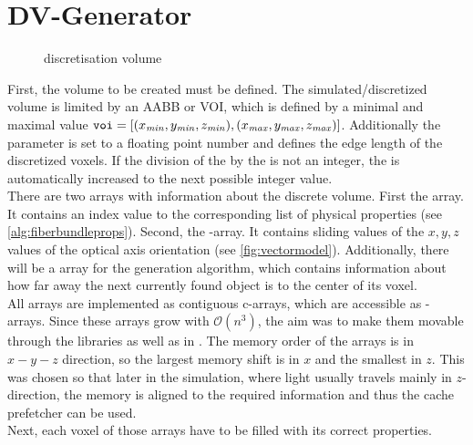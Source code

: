 \section{DV-Generator}
\label{sec:dv_generator}
% 
\begin{figure}[!t]
\centering
\setlength{\tikzwidth}{0.5\textwidth}
\caption{discretisation volume}
\label{fig:discVol}
\end{figure}
% 
First, the volume to be created must be defined.
The simulated/discretized volume is limited by an \ac{AABB} or \ac{VOI}, which is defined by a minimal and maximal value $\texttt{voi} = [(x_{\mathit{min}}, y_{\mathit{min}}, z_{\mathit{min}}),(x_{\mathit{max}}, y_{\mathit{max}}, z_{\mathit{max}})]$.
Additionally the \voxelsize{} parameter \voxels{} is set to a floating point number and defines the edge length of the discretized voxels.
If the division of the \voi{} by the \voxelsize{} is not an integer, the \voi{} is automatically increased to the next possible integer value.
\\
% 
There are two arrays with information about the discrete volume.
First the \tissue{} array.
It contains an index value to the corresponding list of physical properties (see \cref{alg:fiberbundleprops}). 
Second, the \opticalaxis-array.
It contains sliding values of the $x,y,z$ values of the optical axis orientation (see \cref{fig:vectormodel}).
Additionally, there will be a  array for the generation algorithm, which contains information about how far away the next currently found object is to the center of its voxel.
\\
% 
All arrays are implemented as contiguous c-arrays, which are accessible as -arrays.
Since these arrays grow with $\mathcal{O}(n^3)$, the aim was to make them movable through the \cpp{} libraries as well as in \python{}.
The memory order of the arrays is in $x-y-z$ direction, so the largest memory shift is in $x$ and the smallest in $z$.
This was chosen so that later in the simulation, where light usually travels mainly in $z$-direction, the memory is aligned to the required information and thus the cache prefetcher can be used.
\\
% 
Next, each voxel of those arrays have to be filled with its correct properties.
\\[\baselineskip]
% 
